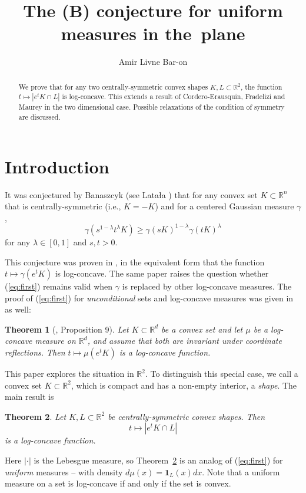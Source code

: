 \documentclass[a4paper,10pt,twoside,reqno,intlimits]{amsart}
\title{The (B) conjecture for uniform measures in the~plane}
\author{Amir Livne Bar-on}
\newtheorem{theorem}{Theorem}
\begin{document}
\begin{abstract}
We prove that for any two centrally-symmetric convex shapes $K,L \subset {\mathbb{R}}^2$,
the function $t \mapsto |e^t K \cap L|$ is log-concave.
This extends a result of Cordero-Erausquin, Fradelizi and Maurey in the two dimensional case.
Possible relaxations of the condition of symmetry are discussed.
\end{abstract}

\maketitle

\section{Introduction}
\label{sec:intro}

It was conjectured by Banaszcyk (see Lata{\l}a \cite{latala}) that for any convex set
$K \subset {\mathbb{R}}^n$ that is centrally-symmetric (i.e., $K = -K$) and for a centered Gaussian measure $\gamma$,
\begin{equation}
\gamma(s^{1-\lambda} t^\lambda K) \ge \gamma(s K)^{1-\lambda} \gamma(t K)^\lambda
\label{eq:first}
\end{equation}
for any $\lambda \in [0,1]$ and $s,t > 0$.

This conjecture was proven in \cite{bconj}, in the equivalent form that the function
${t \mapsto \gamma(e^t K)}$
is log-concave.
The same paper raises the question whether (\ref{eq:first}) remains valid when $\gamma$
is replaced by other log-concave measures.
The proof of (\ref{eq:first}) for \emph{unconditional} sets and log-concave measures was given in
\cite{bconj} as well:
\begin{theorem}[\cite{bconj}, Proposition 9]
\label{thm:uncond}
Let $K \subset {\mathbb{R}}^d$ be a convex set and let $\mu$ be a log-concave measure on ${\mathbb{R}}^d$,
and assume that both are invariant under coordinate reflections.
Then $t \mapsto \mu(e^t K)$ is a log-concave function.
\end{theorem}

This paper explores the situation in ${\mathbb{R}}^2$.
To distinguish this special case, we call a convex set $K \subset {\mathbb{R}}^2$, which is compact and has
a non-empty interior, a \emph{shape}.
The main result is
\begin{theorem}
\label{thm:main}
Let $K,L \subset {\mathbb{R}}^2$ be centrally-symmetric convex shapes.
Then $${t \mapsto |e^t K \cap L|}$$ is a log-concave function.
\end{theorem}
Here $|\cdot|$ is the Lebesgue measure, so Theorem~\ref{thm:main} is an analog of (\ref{eq:first})
for \emph{uniform} measures -- with density $d\mu(x) = \mathbf{1}_L(x) dx$.
Note that a uniform measure on a set is log-concave if and only if the set is convex.
\end{document}
